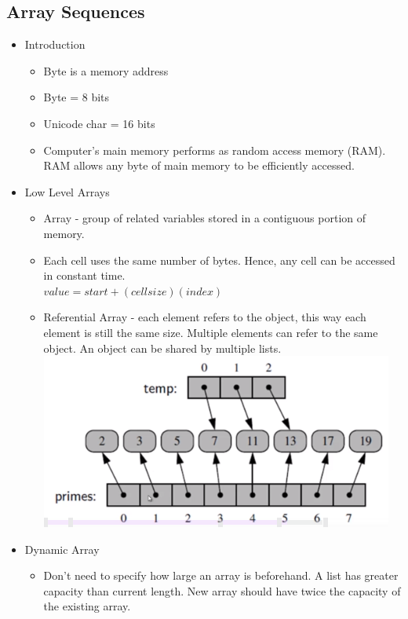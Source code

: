 \documentclass{article}
\begin{document}
\begin{multicols*}{3}
        \section{Array Sequences}
    \renewcommand\labelitemi{{\boldmath$\cdot$}}
    \begin{itemize}[noitemsep]
        \item Introduction
            \begin{itemize}[noitemsep]
                \item Byte is a memory address
                \item Byte = 8 bits
                \item Unicode char = 16 bits 
                \item Computer's main memory performs as random access memory (RAM). RAM allows any byte of main memory to be efficiently accessed.
            \end{itemize}
        \item Low Level Arrays 
            \begin{itemize}[noitemsep]
                \item Array - group of related variables stored in a contiguous portion of memory.
                \item Each cell uses the same number of bytes. Hence, any cell can be accessed in constant time.\\ 
                $value = start + (cellsize)(index)$
                \item Referential Array - each element refers to the object, 
                this way each element is still the same size. Multiple elements can refer 
                to the same object. An object can be shared by multiple lists.
                \includegraphics[width=\linewidth]{referential_array}
            \end{itemize}
        \item Dynamic Array
            \begin{itemize}[noitemsep]
                \item Don't need to specify how large an array is beforehand. 
                A list has greater capacity than current length. New array should have twice the capacity of the 
                existing array.
            \end{itemize}
    \end{itemize}



\end{multicols*}
\end{document}
